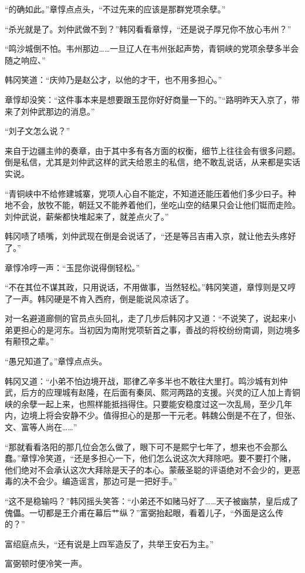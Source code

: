 “的确如此。”章惇点点头，“不过先来的应该是那群党项余孽。”

“杀光就是了。刘仲武做不到？”韩冈看看章惇，“还是说子厚兄你不放心韦州？”

“鸣沙城倒不怕。韦州那边……一旦辽人在韦州张起声势，青铜峡的党项余孽多半会随之响应、”

韩冈笑道：“庆帅乃是赵公才，以他的才干，也不用多担心。”

章惇却没笑：“这件事本来是想要跟玉昆你好好商量一下的。”“路明昨天入京了，带来了刘仲武那边的消息。”

“刘子文怎么说？”

来自于边疆主帅的奏章，由于其中多有各方面的权衡，细节上往往会有很多问题。倒是私信，尤其是刘仲武这样的武夫给恩主的私信，绝不敢乱说话，从来都是实话实说。

“青铜峡中不给修建城寨，党项人心自不能定，不知道还能压着他们多少曰子。种地不会，放牧不能，朝廷又不能养着他们，坐吃山空的结果只会让他们铤而走险。刘仲武说，薪柴都快堆起来了，就差点火了。”

韩冈啧了啧嘴，刘仲武现在倒是会说话了，“还是等吕吉甫入京，就让他去头疼好了。”

章惇冷哼一声：“玉昆你说得倒轻松。”

“不在其位不谋其政，只用说话，不用做事，当然轻松。”韩冈笑道，章惇则是又哼了一声。韩冈硬是不肯入西府，倒是能说风凉话了。

对一名避道廊侧的官员点头回礼，走了几步后韩冈才又道：“不说笑了，说起来小弟更担心的是河东。当初因为南附党项斩首之事，善战的将校纷纷南调，则边境多有颟顸之辈。”

“愚兄知道了。”章惇点点头。

韩冈又道：“小弟不怕边境开战，耶律乙辛多半也不敢往大里打。鸣沙城有刘仲武，后方的应理城有赵隆，在后面有秦凤、熙河两路的支援。兴灵的辽人加上青铜峡的余孽一起上来，也照样能抵挡得住。只要能安稳度过这一次乱局，至少几年内，边境上将会安静不少。值得担心的是那一干元老。韩魏公倒是不在了，但张、文、富等人尚在……”

“那就看看洛阳的那几位会怎么做了，眼下可不是熙宁七年了，想来也不会那么蠢。”章惇冷笑道，“还是多担心一下，他们怎么说这次大拜除吧。要不要打个赌，他们绝对不会承认这次大拜除是天子的本心。蒙蔽圣聪的评语绝对不会少的，更恶毒的决不会少。编造谣言，那边可是一把好手。”

“这不是稳输吗？”韩冈摇头笑答：“小弟还不如赌马好了……天子被幽禁，皇后成了傀儡。一切都是王介甫在幕后艹纵？”富弼抬起眼，看着儿子，“外面是这么传的？”

富绍庭点头，“还有说是上四军造反了，共举王安石为主。”

富弼顿时便冷笑一声。

